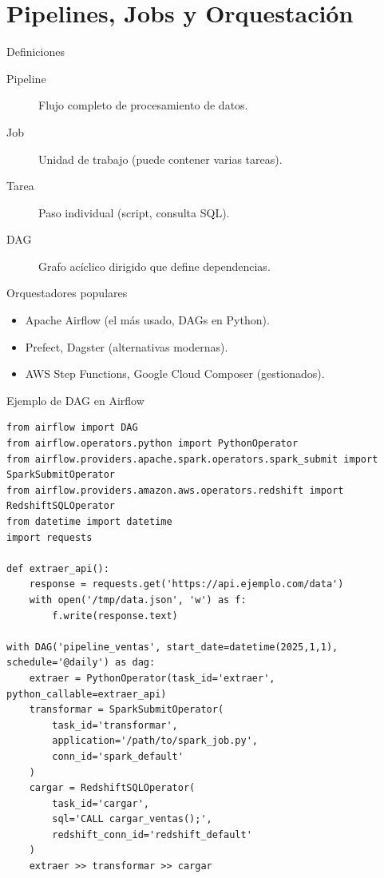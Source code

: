\documentclass[aspectratio=169, 10pt, xcolor=table]{beamer}
\begin{document}
\section{Pipelines, Jobs y Orquestación}

\begin{frame}{Definiciones}
    \begin{description}
        \item[Pipeline] Flujo completo de procesamiento de datos.
        \item[Job] Unidad de trabajo (puede contener varias tareas).
        \item[Tarea] Paso individual (script, consulta SQL).
        \item[DAG] Grafo acíclico dirigido que define dependencias.
    \end{description}
\end{frame}

\begin{frame}{Orquestadores populares}
    \begin{itemize}
        \item Apache Airflow (el más usado, DAGs en Python).
        \item Prefect, Dagster (alternativas modernas).
        \item AWS Step Functions, Google Cloud Composer (gestionados).
    \end{itemize}
\end{frame}

\begin{frame}[fragile]{Ejemplo de DAG en Airflow}
    \begin{lstlisting}[style=python]
from airflow import DAG
from airflow.operators.python import PythonOperator
from airflow.providers.apache.spark.operators.spark_submit import SparkSubmitOperator
from airflow.providers.amazon.aws.operators.redshift import RedshiftSQLOperator
from datetime import datetime
import requests

def extraer_api():
    response = requests.get('https://api.ejemplo.com/data')
    with open('/tmp/data.json', 'w') as f:
        f.write(response.text)

with DAG('pipeline_ventas', start_date=datetime(2025,1,1), schedule='@daily') as dag:
    extraer = PythonOperator(task_id='extraer', python_callable=extraer_api)
    transformar = SparkSubmitOperator(
        task_id='transformar',
        application='/path/to/spark_job.py',
        conn_id='spark_default'
    )
    cargar = RedshiftSQLOperator(
        task_id='cargar',
        sql='CALL cargar_ventas();',
        redshift_conn_id='redshift_default'
    )
    extraer >> transformar >> cargar
    \end{lstlisting}
\end{frame}
\end{document}
